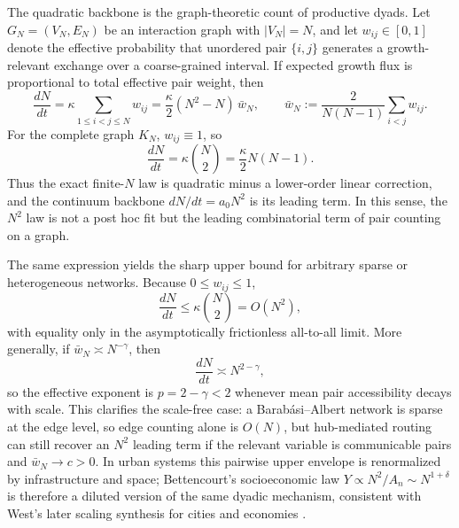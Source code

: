 \documentclass[11pt]{article}
\begin{document}
The quadratic backbone is the graph-theoretic count of productive dyads.
Let $G_N=(V_N,E_N)$ be an interaction graph with $|V_N|=N$, and let
$w_{ij}\in[0,1]$ denote the effective probability that unordered pair
$\{i,j\}$ generates a growth-relevant exchange over a coarse-grained interval.
If expected growth flux is proportional to total effective pair weight, then
\begin{equation}
\frac{dN}{dt}=\kappa\sum_{1\le i<j\le N} w_{ij}=\frac{\kappa}{2}(N^2-N)\,\bar w_N,\qquad
\bar w_N:=\frac{2}{N(N-1)}\sum_{i<j}w_{ij}.
\label{eq:S1_graph_backbone}
\end{equation}
For the complete graph $K_N$, $w_{ij}\equiv 1$, so
\begin{equation}
\frac{dN}{dt}=\kappa\binom{N}{2}=\frac{\kappa}{2}N(N-1).
\end{equation}
Thus the exact finite-$N$ law is quadratic minus a lower-order linear correction,
and the continuum backbone $dN/dt=a_0N^2$ is its leading term.
In this sense, the $N^2$ law is not a post hoc fit but the leading combinatorial
term of pair counting on a graph.

The same expression yields the sharp upper bound for arbitrary sparse or heterogeneous
networks. Because $0\le w_{ij}\le 1$,
\begin{equation}
\frac{dN}{dt}\le \kappa\binom{N}{2}=O(N^2),
\end{equation}
with equality only in the asymptotically frictionless all-to-all limit.
More generally, if $\bar w_N\asymp N^{-\gamma}$, then
\begin{equation}
\frac{dN}{dt}\asymp N^{2-\gamma},
\end{equation}
so the effective exponent is $p=2-\gamma<2$ whenever mean pair accessibility
decays with scale. This clarifies the scale-free case: a Barab\'{a}si--Albert
network is sparse at the edge level, so edge counting alone is $O(N)$, but
hub-mediated routing can still recover an $N^2$ leading term if the relevant
variable is communicable pairs and $\bar w_N\to c>0$. In urban systems this
pairwise upper envelope is renormalized by infrastructure and space; Bettencourt's
socioeconomic law $Y\propto N^2/A_n\sim N^{1+\delta}$ is therefore a diluted
version of the same dyadic mechanism, consistent with West's later scaling
synthesis for cities and economies \cite{barabasialbert1999,bettencourt2013,west2017}.
\end{document}
